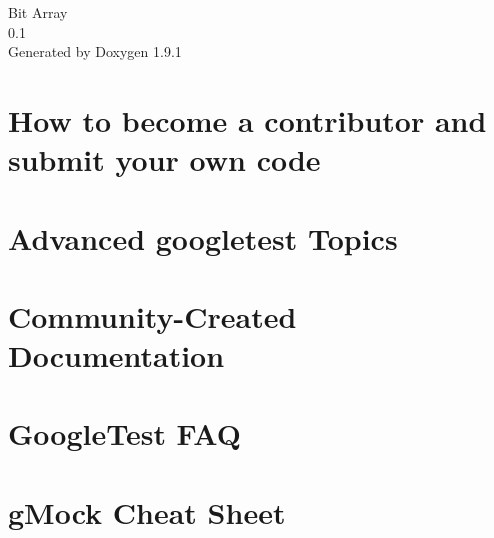 \let\mypdfximage\pdfximage\def\pdfximage{\immediate\mypdfximage}\documentclass[twoside]{book}
\newcommand{\+}{\discretionary{\mbox{\scriptsize$\hookleftarrow$}}{}{}}
\newcommand{\clearemptydoublepage}{%
  \newpage{\pagestyle{empty}\cleardoublepage}%
}
\begin{document}
\raggedbottom

\hypersetup{pageanchor=false,
             bookmarksnumbered=true,
             pdfencoding=unicode
            }
\begin{titlepage}
\vspace*{7cm}
\begin{center}%
{\Large Bit Array \\[1ex]\large 0.\+1 }\\
\vspace*{1cm}
{\large Generated by Doxygen 1.9.1}\\
\end{center}
\end{titlepage}
\clearemptydoublepage
{}
\tableofcontents
\clearemptydoublepage
{}
\hypersetup{pageanchor=true}

\chapter{How to become a contributor and submit your own code}
\label{md_googletest_CONTRIBUTING}

\chapter{Advanced googletest Topics}
\label{md_googletest_docs_advanced}

\chapter{Community-\/\+Created Documentation}
\label{md_googletest_docs_community_created_documentation}

\chapter{Google\+Test FAQ}
\label{md_googletest_docs_faq}

\chapter{g\+Mock Cheat Sheet}
\label{md_googletest_docs_gmock_cheat_sheet}

\end{document}

